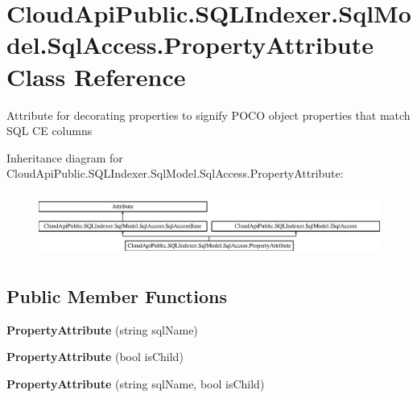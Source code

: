 \hypertarget{class_cloud_api_public_1_1_s_q_l_indexer_1_1_sql_model_1_1_sql_access_1_1_property_attribute}{\section{Cloud\-Api\-Public.\-S\-Q\-L\-Indexer.\-Sql\-Model.\-Sql\-Access.\-Property\-Attribute Class Reference}
\label{class_cloud_api_public_1_1_s_q_l_indexer_1_1_sql_model_1_1_sql_access_1_1_property_attribute}
}


Attribute for decorating properties to signify P\-O\-C\-O object properties that match S\-Q\-L C\-E columns  


Inheritance diagram for Cloud\-Api\-Public.\-S\-Q\-L\-Indexer.\-Sql\-Model.\-Sql\-Access.\-Property\-Attribute\-:\begin{figure}[H]
\begin{center}
\leavevmode
\includegraphics[height=2.115869cm]{class_cloud_api_public_1_1_s_q_l_indexer_1_1_sql_model_1_1_sql_access_1_1_property_attribute}
\end{center}
\end{figure}
\subsection*{Public Member Functions}
\begin{DoxyCompactItemize}
\item 
\hypertarget{class_cloud_api_public_1_1_s_q_l_indexer_1_1_sql_model_1_1_sql_access_1_1_property_attribute_a1ed4995de0981c258971b686d85ece3b}{{\bfseries Property\-Attribute} (string sql\-Name)}\label{class_cloud_api_public_1_1_s_q_l_indexer_1_1_sql_model_1_1_sql_access_1_1_property_attribute_a1ed4995de0981c258971b686d85ece3b}

\item 
\hypertarget{class_cloud_api_public_1_1_s_q_l_indexer_1_1_sql_model_1_1_sql_access_1_1_property_attribute_a05d1b8beec9b3b7f72318dad9a811995}{{\bfseries Property\-Attribute} (bool is\-Child)}\label{class_cloud_api_public_1_1_s_q_l_indexer_1_1_sql_model_1_1_sql_access_1_1_property_attribute_a05d1b8beec9b3b7f72318dad9a811995}

\item 
\hypertarget{class_cloud_api_public_1_1_s_q_l_indexer_1_1_sql_model_1_1_sql_access_1_1_property_attribute_a6aa6fa21e19475e2b397d9b9c36af560}{{\bfseries Property\-Attribute} (string sql\-Name, bool is\-Child)}\label{class_cloud_api_public_1_1_s_q_l_indexer_1_1_sql_model_1_1_sql_access_1_1_property_attribute_a6aa6fa21e19475e2b397d9b9c36af560}

\end{DoxyCompactItemize}

